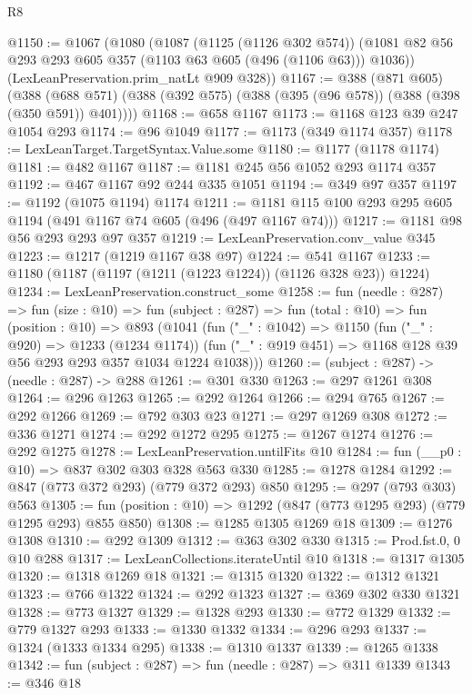\begin{lexlean}{R8}
\begin{coremodule}
@1150 := @1067
    (@1080
      (@1087
        (@1125 (@1126 @302 @574))
        (@1081 @82 @56 @293 @293 @605 @357 (@1103 @63 @605 (@496 (@1106 @63))) @1036))
      (LexLeanPreservation.prim_natLt @909 @328))
@1167 := @388
    (@871 @605)
    (@388 (@688 @571) (@388 (@392 @575) (@388 (@395 (@96 @578)) (@388 (@398 (@350 @591)) @401))))
@1168 := @658 @1167
@1173 := @1168 @123 @39 @247 @1054 @293
@1174 := @96 @1049
@1177 := @1173 (@349 @1174 @357)
@1178 := LexLeanTarget.TargetSyntax.Value.some
@1180 := @1177 (@1178 @1174)
@1181 := @482 @1167
@1187 := @1181 @245 @56 @1052 @293 @1174 @357
@1192 := @467 @1167 @92 @244 @335 @1051
@1194 := @349 @97 @357
@1197 := @1192 (@1075 @1194) @1174
@1211 := @1181 @115 @100 @293 @295 @605 @1194 (@491 @1167 @74 @605 (@496 (@497 @1167 @74)))
@1217 := @1181 @98 @56 @293 @293 @97 @357
@1219 := LexLeanPreservation.conv_value @345
@1223 := @1217 (@1219 @1167 @38 @97)
@1224 := @541 @1167
@1233 := @1180 (@1187 (@1197 (@1211 (@1223 @1224)) (@1126 @328 @23)) @1224)
@1234 := LexLeanPreservation.construct_some
@1258 := fun (needle : @287) =>
  fun (size : @10) =>
  fun (subject : @287) =>
  fun (total : @10) =>
  fun (position : @10) =>
  @893
    (@1041
      (fun ("_" : @1042) =>
      @1150
        (fun ("_" : @920) => @1233 (@1234 @1174))
        (fun ("_" : @919 @451) => @1168 @128 @39 @56 @293 @293 @357 @1034 @1224 @1038)))
@1260 := (subject : @287) -> (needle : @287) -> @288
@1261 := @301 @330
@1263 := @297 @1261 @308
@1264 := @296 @1263
@1265 := @292 @1264
@1266 := @294 @765
@1267 := @292 @1266
@1269 := @792 @303 @23
@1271 := @297 @1269 @308
@1272 := @336 @1271
@1274 := @292 @1272 @295
@1275 := @1267 @1274
@1276 := @292 @1275
@1278 := LexLeanPreservation.untilFits @10
@1284 := fun (__p0 : @10) => @837 @302 @303 @328 @563 @330
@1285 := @1278 @1284
@1292 := @847 (@773 @372 @293) (@779 @372 @293) @850
@1295 := @297 (@793 @303) @563
@1305 := fun (position : @10) => @1292 (@847 (@773 @1295 @293) (@779 @1295 @293) @855 @850)
@1308 := @1285 @1305 @1269 @18
@1309 := @1276 @1308
@1310 := @292 @1309
@1312 := @363 @302 @330
@1315 := Prod.fst.{0, 0} @10 @288
@1317 := LexLeanCollections.iterateUntil @10
@1318 := @1317 @1305
@1320 := @1318 @1269 @18
@1321 := @1315 @1320
@1322 := @1312 @1321
@1323 := @766 @1322
@1324 := @292 @1323
@1327 := @369 @302 @330 @1321
@1328 := @773 @1327
@1329 := @1328 @293
@1330 := @772 @1329
@1332 := @779 @1327 @293
@1333 := @1330 @1332
@1334 := @296 @293
@1337 := @1324 (@1333 @1334 @295)
@1338 := @1310 @1337
@1339 := @1265 @1338
@1342 := fun (subject : @287) => fun (needle : @287) => @311 @1339
@1343 := @346 @18

\end{coremodule}
\end{lexlean}
